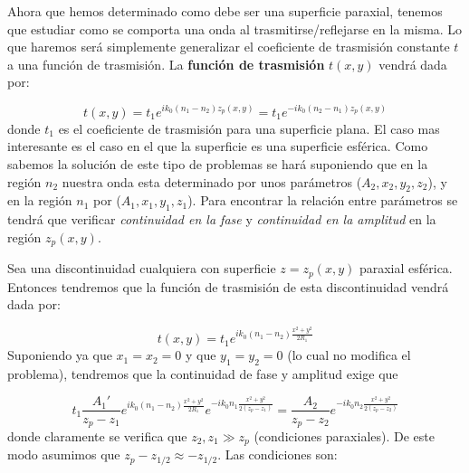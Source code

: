 \documentclass[12pt,a4paper]{book}
\numberwithin{equation}{section}
\numberwithin{figure}{section}
\newcommand{\1}{_{(1)}}
\newcommand{\2}{_{(2)}}
\theoremstyle{definition}
\begin{document}
Ahora que hemos determinado como debe ser una superficie paraxial, tenemos que estudiar como se comporta una onda al trasmitirse/reflejarse  en la misma. Lo que haremos será simplemente generalizar el coeficiente de trasmisión constante $t$ a una función de trasmisión. La \textbf{función de trasmisión} $t(x,y)$ vendrá dada por:

\begin{equation}
t(x,y) = t_1 e^{i k_0 (n_1 - n_2) z_p (x,y)} = t_1 e^{-i k_0 (n_2 - n_1) z_p (x,y)} 
\end{equation}
donde $t_1$ es el coeficiente de trasmisión para una superficie plana. El caso mas interesante es el caso en el que la superficie es una superficie esférica. Como sabemos la solución de este tipo de problemas se hará suponiendo que en la región $n_2$ nuestra onda esta determinado por unos parámetros ($A_2,x_2,y_2,z_2$), y en la región $n_1$ por ($A_1,x_1,y_1,z_1$). Para encontrar la relación entre parámetros se tendrá que verificar \textit{continuidad en la fase} y \textit{continuidad en la amplitud} en la región $z_p(x,y)$.  \\



\hrulefill

Sea una discontinuidad cualquiera con superficie $z=z_p(x,y)$ paraxial esférica. Entonces tendremos que la función de trasmisión de esta discontinuidad vendrá dada por:

\begin{equation}
t(x,y) = t_1 e^{i k_0(n_1-n_2) \frac{x^2+y^2}{2 R_1}}
\end{equation}
Suponiendo ya que $x_1=x_2 = 0$ y que $y_1=y_2=0$ (lo cual no modifica el problema), tendremos que la continuidad de fase y amplitud exige que

\begin{equation}
t_1 \frac{A_1'}{z_p - z_1} e^{i k_0(n_1-n_2) \frac{x^2+y^2}{2 R_1}} e^{-i k_0 n_1 \frac{x^2+y^2}{2(z_p - z_1)}} = \frac{A_2}{z_p - z_2} e^{-i k_0 n_2 \frac{x^2+y^2}{2(z_p - z_2)}}
\end{equation}
donde claramente se verifica que $z_2,z_1 \gg z_p$ (condiciones paraxiales). De este modo asumimos que $z_p-z_{1/2} \approx - z_{1/2}$. Las condiciones son:
\end{document}
